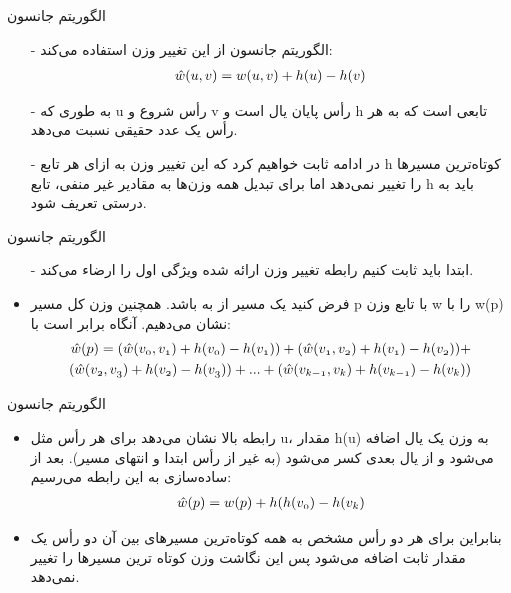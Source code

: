\begin{frame}{الگوریتم جانسون}
	\begin{itemize}\itemr
\item[-]
الگوریتم جانسون از این تغییر وزن استفاده می‌کند:
\begin{align*}
	\mathnormal{\hat{w}(u, v)} = \mathnormal{w(u, v)} + h(u) - h(v)
\end{align*}
\item[-]
به طوری که u رأس شروع و v رأس پایان یال است و h تابعی است که به هر رأس یک عدد حقیقی نسبت می‌دهد.
\item[-]
در ادامه ثابت خواهیم کرد که این تغییر وزن به ازای هر تابع h کوتاه‌ترین مسیرها را تغییر نمی‌دهد اما برای تبدیل همه وزن‌ها به مقادیر غیر منفی، تابع h باید به درستی تعریف شود.
	\end{itemize}
\end{frame}
\begin{frame}{الگوریتم جانسون}
	\begin{itemize}\itemr
		\item[-]
ابتدا باید ثابت ‌کنیم رابطه تغییر وزن ارائه شده ویژگی اول را ارضاء می‌کند.
		\item
فرض کنید
یک مسیر از
به
باشد. همچنین وزن کل مسیر p با تابع وزن w را با  w(p) نشان می‌دهیم. آنگاه
برابر است با:
		\begin{align*}
			\mathnormal{\hat{w}(p)= (\hat{w}(v_0, v_1) + h(v_0) -  h(v_1)) + (\hat{w}(v_1, v_2) + h(v_1) -  h(v_2)) + }
			\\
			\mathnormal{(\hat{w}(v_2, v_3) + h(v_2) -  h(v_3)) + ... + (\hat{w}(v_{k-1}, v_k) + h(v_{k-1}) -  h(v_k))}
		\end{align*}

	\end{itemize}
\end{frame}
\begin{frame}{الگوریتم جانسون}
	\begin{itemize}\itemr
\item
رابطه بالا نشان می‌دهد برای هر رأس مثل u، مقدار h(u) به وزن یک یال اضافه می‌شود و از یال بعدی کسر می‌شود (به غیر از رأس ابتدا و انتهای مسیر). بعد از ساده‌سازی به این رابطه می‌رسیم:
\begin{align*}
	\mathnormal{\hat{w}(p)=w(p) + h(h(v_0) - h(v_k)}
\end{align*}
\item
بنابراین برای هر دو رأس مشخص به همه کوتاه‌ترین مسیرهای بین آن دو رأس یک مقدار ثابت اضافه می‌شود پس این نگاشت وزن کوتاه ترین مسیرها را تغییر نمی‌دهد.
	\end{itemize}
\end{frame}

